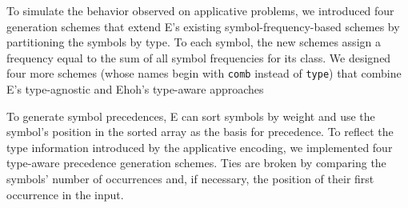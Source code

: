 To simulate the behavior observed on applicative problems,
we introduced four generation schemes that extend E's existing
symbol-frequency-based schemes by partitioning the symbols by type. To each
symbol, the new schemes assign a frequency equal to the sum of all
symbol frequencies for its class.
%
We designed four more schemes (whose names begin with \verb|comb| instead of \verb|type|) that combine E's type-agnostic
and Ehoh's type-aware approaches

To generate symbol precedences, E can sort symbols by weight
and use the symbol's position in the sorted array as the basis for precedence.
To reflect the type information introduced by the applicative encoding, we
implemented four type-aware precedence generation schemes.
%
Ties are broken by comparing the symbols' number of occurrences and, if
necessary, the position of their first occurrence in the input.

